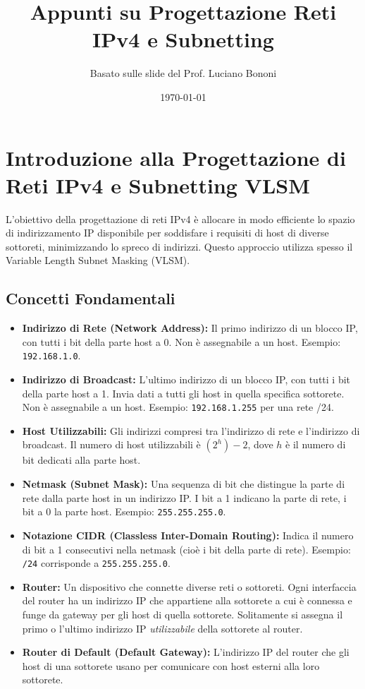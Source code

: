 

\title{Appunti su Progettazione Reti IPv4 e Subnetting}
\author{Basato sulle slide del Prof. Luciano Bononi}
\date{\today}



\maketitle
\tableofcontents
\newpage

\section{Introduzione alla Progettazione di Reti IPv4 e Subnetting VLSM}
L'obiettivo della progettazione di reti IPv4 è allocare in modo efficiente lo spazio di indirizzamento IP disponibile per soddisfare i requisiti di host di diverse sottoreti, minimizzando lo spreco di indirizzi. Questo approccio utilizza spesso il Variable Length Subnet Masking (VLSM).

\subsection{Concetti Fondamentali}
\begin{itemize}
    \item \textbf{Indirizzo di Rete (Network Address):} Il primo indirizzo di un blocco IP, con tutti i bit della parte host a 0. Non è assegnabile a un host. Esempio: \texttt{192.168.1.0}.
    \item \textbf{Indirizzo di Broadcast:} L'ultimo indirizzo di un blocco IP, con tutti i bit della parte host a 1. Invia dati a tutti gli host in quella specifica sottorete. Non è assegnabile a un host. Esempio: \texttt{192.168.1.255} per una rete /24.
    \item \textbf{Host Utilizzabili:} Gli indirizzi compresi tra l'indirizzo di rete e l'indirizzo di broadcast. Il numero di host utilizzabili è $(2^h) - 2$, dove $h$ è il numero di bit dedicati alla parte host.
    \item \textbf{Netmask (Subnet Mask):} Una sequenza di bit che distingue la parte di rete dalla parte host in un indirizzo IP. I bit a 1 indicano la parte di rete, i bit a 0 la parte host. Esempio: \texttt{255.255.255.0}.
    \item \textbf{Notazione CIDR (Classless Inter-Domain Routing):} Indica il numero di bit a 1 consecutivi nella netmask (cioè i bit della parte di rete). Esempio: \texttt{/24} corrisponde a \texttt{255.255.255.0}.
    \item \textbf{Router:} Un dispositivo che connette diverse reti o sottoreti. Ogni interfaccia del router ha un indirizzo IP che appartiene alla sottorete a cui è connessa e funge da gateway per gli host di quella sottorete. Solitamente si assegna il primo o l'ultimo indirizzo IP \textit{utilizzabile} della sottorete al router.
    \item \textbf{Router di Default (Default Gateway):} L'indirizzo IP del router che gli host di una sottorete usano per comunicare con host esterni alla loro sottorete.
\end{itemize}

